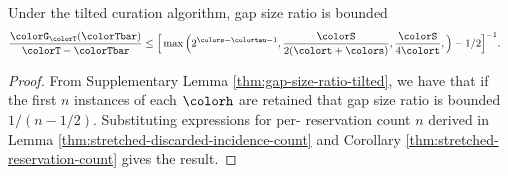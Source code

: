 \begin{theorem}
\label{thm:tilted-gap-size}
Under the tilted curation algorithm, gap size ratio is bounded
\begin{align*}
  \frac{\colorG_{\colorT}(\colorTbar)}{\colorT - \colorTbar}
  &\leq
  \Big[
    \max\Big(
      2^{\colors - \colortau - 1},
      \frac{\colorS}{2(\colort + \colors)},
      \frac{\colorS}{4\colort},
    \Big)
    - 1/2
  \Big]^{-1}.
\end{align*}
\end{theorem}
\begin{proof}

From Supplementary Lemma \ref{thm:gap-size-ratio-tilted}, we have that if the first $n$ instances of each \hv{} $\colorh$ are retained that gap size ratio is bounded $1/(n - 1/2)$.
Substituting expressions for per-\hv{} reservation count $n$ derived in Lemma \ref{thm:stretched-discarded-incidence-count} and Corollary \ref{thm:stretched-reservation-count} gives the result.
\end{proof}
